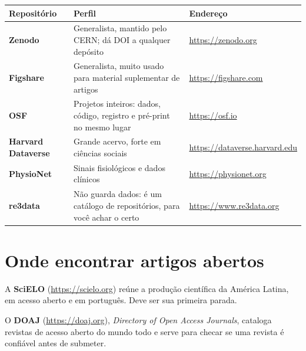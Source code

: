 \documentclass[
]{book}
\newcounter{none} %
\begin{document}
{\def\LTcaptype{none} %
\begin{longtable}[]{@{}
  >{\raggedright\arraybackslash}p{}
  >{\raggedright\arraybackslash}p{}
  >{\raggedright\arraybackslash}p{}@{}}
\toprule\noalign{}
\begin{minipage}[b]{\linewidth}\raggedright
Repositório
\end{minipage} & \begin{minipage}[b]{\linewidth}\raggedright
Perfil
\end{minipage} & \begin{minipage}[b]{\linewidth}\raggedright
Endereço
\end{minipage} \\
\midrule\noalign{}
\endhead
\bottomrule\noalign{}
\endlastfoot
\textbf{Zenodo} & Generalista, mantido pelo CERN; dá DOI a qualquer depósito & \url{https://zenodo.org} \\
\textbf{Figshare} & Generalista, muito usado para material suplementar de artigos & \url{https://figshare.com} \\
\textbf{OSF} & Projetos inteiros: dados, código, registro e pré-print no mesmo lugar & \url{https://osf.io} \\
\textbf{Harvard Dataverse} & Grande acervo, forte em ciências sociais & \url{https://dataverse.harvard.edu} \\
\textbf{PhysioNet} & Sinais fisiológicos e dados clínicos & \url{https://physionet.org} \\
\textbf{re3data} & Não guarda dados: é um catálogo de repositórios, para você achar o certo & \url{https://www.re3data.org} \\
\end{longtable}
}

\section{Onde encontrar artigos abertos}\label{onde-encontrar-artigos-abertos}

A \textbf{SciELO} (\url{https://scielo.org}) reúne a produção científica da América Latina, em acesso aberto e em português. Deve ser sua primeira parada.

O \textbf{DOAJ} (\url{https://doaj.org}), \emph{Directory of Open Access Journals}, cataloga revistas de acesso aberto do mundo todo e serve para checar se uma revista é confiável antes de submeter.
\end{document}
